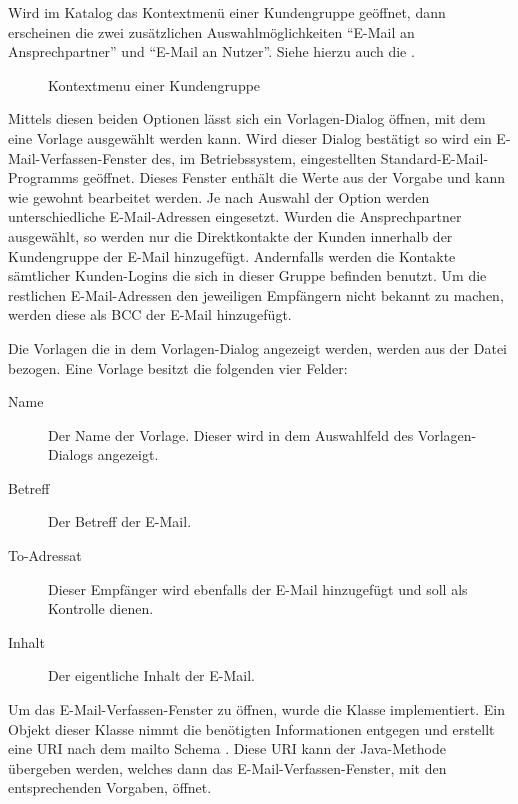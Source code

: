 Wird im Katalog das Kontextmenü einer Kundengruppe geöffnet, dann erscheinen die zwei zusätzlichen Auswahlmöglichkeiten "`E-Mail an Ansprechpartner"' und "`E-Mail an Nutzer"'.
Siehe hierzu auch die .
\begin{figure}[htb]
	\centering
	\caption{Kontextmenu einer Kundengruppe}
	\label{fig:gui-kundengruppe-context}
\end{figure}
Mittels diesen beiden Optionen lässt sich ein Vorlagen-Dialog öffnen, mit dem eine Vorlage ausgewählt werden kann.
Wird dieser Dialog bestätigt so wird ein E-Mail-Verfassen-Fenster des, im Betriebssystem, eingestellten Standard-E-Mail-Programms geöffnet.
Dieses Fenster enthält die Werte aus der Vorgabe und kann wie gewohnt bearbeitet werden.
Je nach Auswahl der Option werden unterschiedliche E-Mail-Adressen eingesetzt.
Wurden die Ansprechpartner ausgewählt, so werden nur die Direktkontakte der Kunden innerhalb der Kundengruppe der E-Mail hinzugefügt.
Andernfalls werden die Kontakte sämtlicher Kunden-Logins die sich in dieser Gruppe befinden benutzt.
Um die restlichen E-Mail-Adressen den jeweiligen Empfängern nicht bekannt zu machen, werden diese als BCC der E-Mail hinzugefügt.

Die Vorlagen die in dem Vorlagen-Dialog angezeigt werden, werden aus der Datei  bezogen. Eine Vorlage besitzt die folgenden vier Felder:
\begin{description}
\item[Name] Der Name der Vorlage. Dieser wird in dem Auswahlfeld des Vorlagen-Dialogs angezeigt.
\item[Betreff] Der Betreff der E-Mail.
\item[To-Adressat] Dieser Empfänger wird ebenfalls der E-Mail hinzugefügt und soll als Kontrolle dienen.
\item[Inhalt] Der eigentliche Inhalt der E-Mail.
\end{description}

Um das E-Mail-Verfassen-Fenster zu öffnen, wurde die Klasse  implementiert.
Ein Objekt dieser Klasse nimmt die benötigten Informationen entgegen und erstellt eine URI nach dem mailto Schema \autocite{RFC2368}.
Diese URI kann der Java-Methode  \autocite{java-mailto} übergeben werden, welches dann das E-Mail-Verfassen-Fenster, mit den entsprechenden Vorgaben, öffnet.

